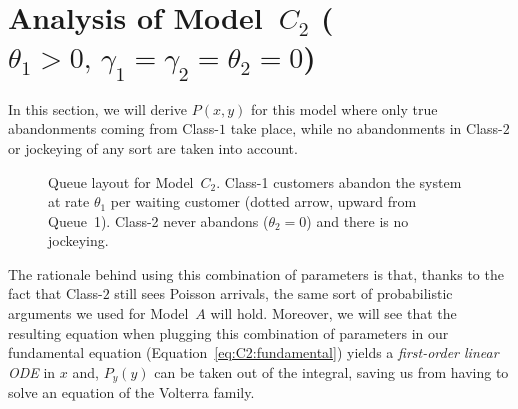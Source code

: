 \section{Analysis of Model~$C_2$ ($\theta_1>0,\,\gamma_1=\gamma_2=\theta_2=0$)}\label{sec:model_c2}

In this section, we will derive $P(x,y)$ for this model where only true abandonments coming from Class-$1$ take place, while no abandonments in Class-$2$ or jockeying of any sort are taken into account.

\begin{figure}[H]
    \centering
    \resizebox{0.62\textwidth}{!}{%
    }
    \caption{Queue layout for Model~$C_2$. Class-1 customers abandon the system
    at rate $\theta_1$ per waiting customer (dotted arrow, upward from Queue~1).
    Class-2 never abandons ($\theta_2=0$) and there is no jockeying.}
    \label{fig:model-c2-queue}
\end{figure} The rationale behind using this combination of parameters is that, thanks to the fact that Class-$2$ still sees Poisson arrivals, the same sort of probabilistic arguments we used for Model~$A$ will hold. Moreover, we will see that the resulting equation when plugging this combination of parameters in our fundamental equation (Equation~\eqref{eq:C2:fundamental}) yields a \textit{first-order linear ODE} in $x$ and, $P_y(y)$ can be taken out of the integral, saving us from having to solve an equation of the Volterra family.


